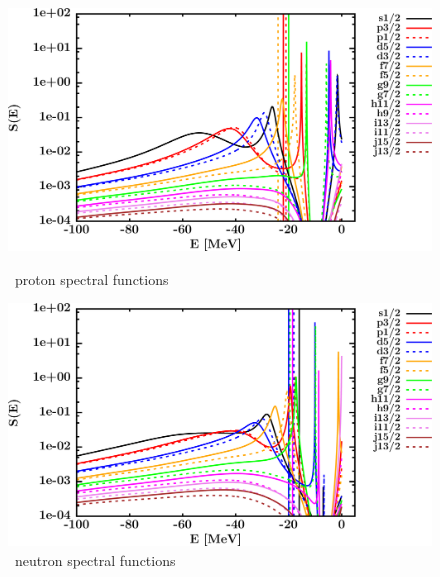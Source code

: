 \begin{figure}[hbtp]
    \centering
    \begin{minipage}{0.42\textwidth}
        \centering
        \includegraphics[width=\textwidth]{figures/sn124_protonSpectralFunctions.png}
        \caption*{\snFour\ proton spectral functions}
        \label{DOMFitData_sn124_proton_spectralFunctions}
    \end{minipage}\hspace{6pt}
    \begin{minipage}{0.42\textwidth}
        \centering
        \includegraphics[width=\linewidth]{figures/sn124_neutronSpectralFunctions.png}
        \caption*{\snFour\ neutron spectral functions}
        \label{DOMFitData_sn124_neutron_spectralFunctions}
    \end{minipage}
\end{figure}
